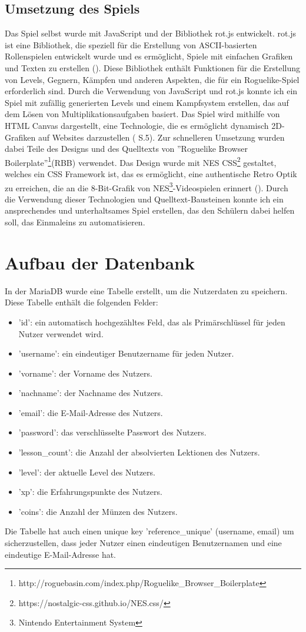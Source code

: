 \documentclass[fontsize:11pt]{article}
\begin{document}
    \subsection{Umsetzung des Spiels}
        Das Spiel selbst wurde mit JavaScript und der Bibliothek rot.js entwickelt. rot.js ist eine Bibliothek, die speziell für die Erstellung von ASCII-basierten Rollenspielen entwickelt wurde und es ermöglicht, Spiele mit einfachen Grafiken und Texten zu erstellen (\cite{rotjs_2012}). Diese Bibliothek enthält Funktionen für die Erstellung von Levels, Gegnern, Kämpfen und anderen Aspekten, die für ein Roguelike-Spiel erforderlich sind.
        Durch die Verwendung von JavaScript und rot.js konnte ich ein Spiel mit zufällig generierten Levels und einem Kampfsystem erstellen, das auf dem Lösen von Multiplikationsaufgaben basiert. Das Spiel wird mithilfe von HTML Canvas dargestellt, eine Technologie, die es ermöglicht dynamisch 2D-Grafiken auf Websites darzustellen (\cite{javascriptGameDev} S.5). Zur schnelleren Umsetzung wurden dabei Teile des Designs und des Quelltexts von ''Roguelike Browser Boilerplate''\footnote{http://roguebasin.com/index.php/Roguelike\_Browser\_Boilerplate}(RBB) verwendet. Das Design wurde mit NES CSS\footnote{https://nostalgic-css.github.io/NES.css/} gestaltet, welches ein CSS Framework ist, das es ermöglicht, eine authentische Retro Optik zu erreichen, die an die 8-Bit-Grafik von NES\footnote{Nintendo Entertainment System}-Videospielen erinnert (\cite{bcrikko_nescss_nodate}). Durch die Verwendung dieser Technologien und Quelltext-Bausteinen konnte ich ein ansprechendes und unterhaltsames Spiel erstellen, das den Schülern dabei helfen soll, das Einmaleins zu automatisieren.
\section{Aufbau der Datenbank}
In der MariaDB wurde eine Tabelle erstellt, um die Nutzerdaten zu speichern. Diese Tabelle enthält die folgenden Felder:
\begin{itemize}
\item 'id': ein automatisch hochgezähltes Feld, das als Primärschlüssel für jeden Nutzer verwendet wird.
\item 'username': ein eindeutiger Benutzername für jeden Nutzer.
\item 'vorname': der Vorname des Nutzers.
\item 'nachname': der Nachname des Nutzers.
\item 'email': die E-Mail-Adresse des Nutzers.
\item 'password': das verschlüsselte Passwort des Nutzers.
\item 'lesson\_count': die Anzahl der absolvierten Lektionen des Nutzers.
\item 'level': der aktuelle Level des Nutzers.
\item 'xp': die Erfahrungspunkte des Nutzers.
\item 'coins': die Anzahl der Münzen des Nutzers.
\end{itemize}
Die Tabelle hat auch einen unique key 'reference\_unique' (username, email) um sicherzustellen, dass jeder Nutzer einen eindeutigen Benutzernamen und eine eindeutige E-Mail-Adresse hat.
\end{document}
